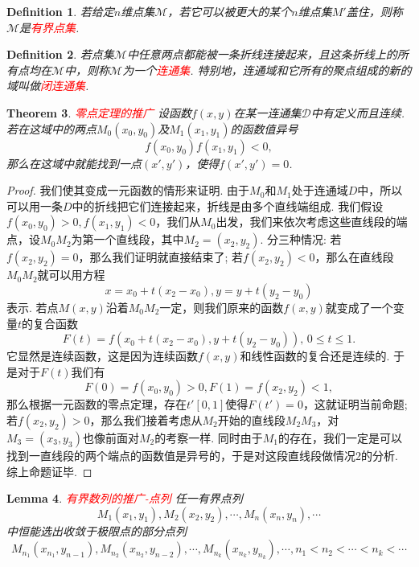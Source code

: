 \documentclass{article}
\newtheorem{theorem}{Theorem}[section]
\newtheorem{lemma}[theorem]{Lemma}
\newtheorem{definition}[theorem]{Definition}
\newcommand{\redt}[1]{\textcolor{red}{#1}}
\begin{document}
\begin{definition}
\rm 若给定$n$维点集$\mathcal{M}$，若它可以被更大的某个$n$维点集$M'$盖住，则称$\mathcal{M}$是\redt{有界点集}. 
\end{definition}

\begin{definition}
\rm 若点集$\mathcal{M}$中任意两点都能被一条折线连接起来，且这条折线上的所有点均在$\mathcal{M}$中，则称$\mathcal{M}$为一个\redt{连通集}. 特别地，连通域和它所有的聚点组成的新的域叫做\redt{闭连通集}.  
\end{definition}

\begin{theorem}
\rm \redt{零点定理的推广} 设函数$f(x,y)$在某一连通集$\mathcal{D}$中有定义而且连续. 若在这域中的两点$M_0(x_0,y_0)$及$M_1(x_1,y_1)$的函数值异号
$$
f(x_0,y_0)f(x_1,y_1) < 0,
$$
那么在这域中就能找到一点$(x',y')$，使得$f(x',y') = 0$.
\end{theorem}

\begin{proof}
我们使其变成一元函数的情形来证明. 由于$M_0$和$M_1$处于连通域$D$中，所以可以用一条$D$中的折线把它们连接起来，折线是由多个直线端组成. 我们假设$f(x_0,y_0) > 0,f(x_1,y_1) < 0$，我们从$M_0$出发，我们来依次考虑这些直线段的端点，设$M_0M_2$为第一个直线段，其中$M_2=(x_2,y_2)$. 分三种情况: 若$f(x_2,y_2) = 0$，那么我们证明就直接结束了; 若$f(x_2,y_2) < 0$，那么在直线段$M_0M_2$就可以用方程
$$
x = x_0  + t(x_2 - x_0), y = y + t(y_2-y_0)
$$
表示. 若点$M(x,y)$沿着$M_0M_2$一定，则我们原来的函数$f(x,y)$就变成了一个变量$t$的复合函数
$$
F(t) = f(x_0  + t(x_2 - x_0),y + t(y_2-y_0)), \, 0 \leq t \leq 1.
$$
它显然是连续函数，这是因为连续函数$f(x,y)$和线性函数的复合还是连续的. 于是对于$F(t)$我们有
$$
F(0) = f(x_0,y_0) > 0, F(1) = f(x_2,y_2) < 1,
$$
那么根据一元函数的零点定理，存在$t' [0,1]$使得$F(t') = 0$，这就证明当前命题; 若$f(x_2,y_2) > 0$，那么我们接着考虑从$M_2$开始的直线段$M_2M_3$，对$M_3=(x_3,y_3)$也像前面对$M_2$的考察一样. 同时由于$M_1$的存在，我们一定是可以找到一直线段的两个端点的函数值是异号的，于是对这段直线段做情况2的分析. 综上命题证毕.   
\end{proof}

\begin{lemma}\label{point-sequence: bounded-then-coverage}
\rm \redt{有界数列的推广-点列} 任一有界点列
$$
M_1(x_1,y_1), M_2(x_2,y_2), \cdots , M_n(x_n,y_n),\cdots
$$
中恒能选出收敛于极限点的部分点列
$$
M_{n_1}(x_{n_1},y_{n-1}),M_{n_2}(x_{n_2},y_{n-2}),\cdots,M_{n_k}(x_{n_k},y_{n_k}),\cdots, n_1 < n_2 < \cdots < n_k <\cdots
$$
\end{lemma}
\end{document}
